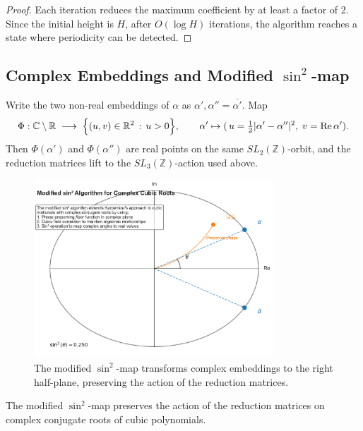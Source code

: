 \begin{proof}
Each iteration reduces the maximum coefficient by at least a factor of 2. Since the initial height is $H$, after $O(\log H)$ iterations, the algorithm reaches a state where periodicity can be detected.
\end{proof}

\subsection{Complex Embeddings and Modified $\sin^2$-map}

\begin{definition}\label{def:modified_sin2}
Write the two non-real embeddings of $\alpha$ as $\alpha',\alpha''= \overline{\alpha'}$.
Map
\[
\Phi:\mathbb{C}\setminus\mathbb{R} \;\longrightarrow\;
\Bigl\{(u,v)\in\mathbb{R}^{2}\,:\,u>0\Bigr\},\qquad
\alpha' \mapsto (\,u=\tfrac12|\alpha'-\alpha''|^{2},\;v=\operatorname{Re}\alpha').
\]
Then $\Phi(\alpha')$ and $\Phi(\alpha'')$ are real points on the same $SL_{2}(\mathbb{Z})$-orbit, and the reduction matrices lift to the $SL_{3}(\mathbb{Z})$-action used above.
\end{definition}

\begin{figure}[htbp]
\centering
\includegraphics[width=0.8\textwidth]{figures/sin2_algorithm_visualization.pdf}
\caption{The modified $\sin^2$-map transforms complex embeddings to the right half-plane, preserving the action of the reduction matrices.}
\label{fig:complex_embedding}
\end{figure}

\begin{lemma}\label{lem:complex_conjugate}
The modified $\sin^2$-map preserves the action of the reduction matrices on complex conjugate roots of cubic polynomials.
\end{lemma}

